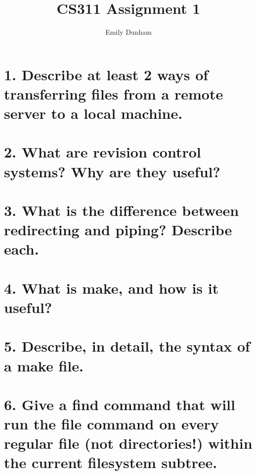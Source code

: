 \documentclass[10pt]{article}
\title{CS311 Assignment 1}
\author{Emily Dunham}
\date{}
\begin{document}
\maketitle

\section{1. Describe at least 2 ways of transferring files from a remote
server to a local machine.} 



\section{2. What are revision control systems? Why are they useful?}



\section{3. What is the difference between redirecting and piping? Describe each.}



\section{4. What is make, and how is it useful?}



\section{5. Describe, in detail, the syntax of a make file.}



\section{6. Give a find command that will run the file command on every regular file (not
directories!) within the current filesystem subtree.}
\end{document}
